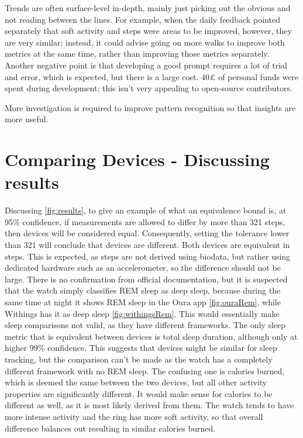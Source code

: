 Trends are often surface-level in-depth, mainly just picking out the obvious and not reading between the lines. For example, when the daily feedback pointed separately that soft activity and steps were areas to be improved, however, they are very similar; instead, it could advise going on more walks to improve both metrics at the same time, rather than improving those metrics separately. Another negative point is that developing a good prompt requires a lot of trial and error, which is expected, but there is a large cost. 40£ of personal funds were spent during development; this isn't very appealing to open-source contributors.

More investigation is required to improve pattern recognition so that insights are more useful.
\section{Comparing Devices - Discussing results}
Discussing \ref{fig:results}, to give an example of what an equivalence bound is, at 95\% confidence, if measurements are allowed to differ by more than 321 steps, then devices will be considered equal. Consequently, setting the tolerance lower than 321 will conclude that devices are different. Both devices are equivalent in steps. This is expected, as steps are not derived using biodata, but rather using dedicated hardware such as an accelerometer, so the difference should not be large. There is no confirmation from official documentation, but it is suspected that the watch simply classifies REM sleep as deep sleep, because during the same time at night it shows REM sleep in the Oura app \ref{fig:ouraRem}, while Withings has it as deep sleep \ref{fig:withingsRem}. This would essentially make sleep comparisons not valid, as they have different frameworks. The only sleep metric that is equivalent between devices is total sleep duration, although only at higher 99\% confidence. This suggests that devices might be similar for sleep tracking, but the comparison can't be made as the watch has a completely different framework with no REM sleep.  The confusing one is calories burned, which is deemed the same between the two devices, but all other activity properties are significantly different. It would make sense for calories to be different as well, as it is most likely derived from them. The watch tends to have more intense activity and the ring has more soft activity, so that overall difference balances out resulting in similar calories burned.
